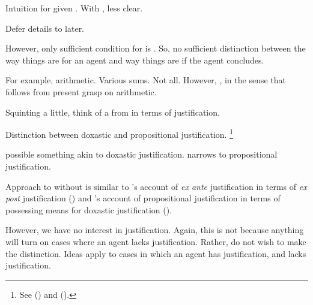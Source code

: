 \begin{note}
  \color{red}
  Intuition for \ros{} given \supportI{}.
  With \supportII{}, less clear.

  Defer details to later.

  However, only sufficient condition for \ros{} is \supportI{}.
  So, no sufficient distinction between the way things are for an agent and way things are if the agent concludes.

  For example, arithmetic.
  Various sums.
  Not all.
  However, \ros{}, in the sense that follows from present grasp on arithmetic.
\end{note}

\begin{note}
  Squinting a little, think of a \ros{} from \supportI{} in terms of justification.

  Distinction between doxastic and propositional justification.%
  \footnote{
    See (\cite{Firth:1978vi}) and (\cite[esp.\ fn.1]{Silva:2020aa}).
  }

  \supportI{} possible something akin to doxastic justification.
  \supportII{} narrows to propositional justification.

  Approach to  without \wit{} is similar to \citeauthor{Goldman:1979ui}'s account of \emph{ex ante} justification in terms of \emph{ex post} justification (\citeyear[21]{Goldman:1979ui}) and \citeauthor{Turri:2010aa}'s account of propositional justification in terms of possessing means for doxastic justification (\citeyear[320]{Turri:2010aa}).

  However, we have no interest in justification.
  Again, this is not because anything will turn on cases where an agent lacks justification.
  Rather, do not wish to make the distinction.
  Ideas apply to cases in which an agent has justification, and lacks justification.
\end{note}









